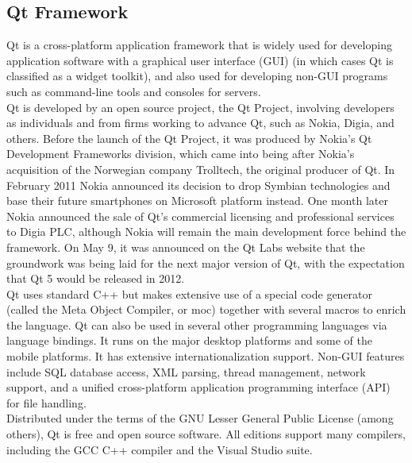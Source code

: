 \subsection{Qt Framework}
\hspace*{0.82cm}Qt is a cross-platform application framework that is widely used for developing application software with a graphical 
user interface (GUI) (in which cases Qt is classified as a widget toolkit), and also used for developing non-GUI programs such as 
command-line tools and consoles for servers.\\[0.5cm]
\hspace*{0.82cm}Qt is developed by an open source project, the Qt Project, involving developers as individuals and from firms working 
to advance Qt, such as Nokia, Digia, and others. Before the launch of the Qt Project, it was produced by Nokia's Qt Development Frameworks 
division, which came into being after Nokia's acquisition of the Norwegian company Trolltech, the original producer of Qt. In February 
2011 Nokia announced its decision to drop Symbian technologies and base their future smartphones on Microsoft platform instead. One 
month later Nokia announced the sale of Qt's commercial licensing and professional services to Digia PLC, although Nokia will remain 
the main development force behind the framework. On May 9, it was announced on the Qt Labs website that the groundwork was being laid 
for the next major version of Qt, with the expectation that Qt 5 would be released in 2012.\\[0.5cm]
\hspace*{0.82cm}Qt uses standard C++ but makes extensive use of a special code generator (called the Meta Object Compiler, or moc) 
together with several macros to enrich the language. Qt can also be used in several other programming languages via language bindings. 
It runs on the major desktop platforms and some of the mobile platforms. It has extensive internationalization support. Non-GUI 
features include SQL database access, XML parsing, thread management, network support, and a unified cross-platform application 
programming interface (API) for file handling.\\[0.5cm]
\hspace*{0.82cm}Distributed under the terms of the GNU Lesser General Public License (among others), Qt is free and open source 
software. All editions support many compilers, including the GCC C++ compiler and the Visual Studio suite.

